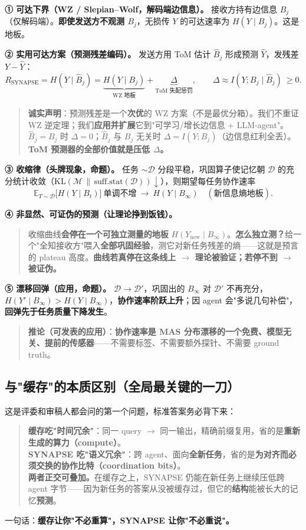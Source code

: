 \documentclass[UTF8,fontset=windows,11pt]{ctexart}
\newcommand{\key}[1]{\textbf{\textcolor{NavyBlue}{#1}}}
\begin{document}
\textbf{① 可达下界（WZ / Slepian--Wolf，解码端边信息）。} 接收方持有边信息 $B_j$（仅解码端）。\textbf{即使发送方不观测 $B_j$}，无损传 $Y$ 的可达速率为 $H(Y\mid B_j)$。这是地板。

\textbf{② 实用可达方案（预测残差编码）。} 发送方用 ToM 估计 $\hat B_j$ 形成预测 $\hat Y$，发残差 $Y-\hat Y$：
\[
R_{\text{SYNAPSE}}=H(Y\mid \hat B_j)=\underbrace{H(Y\mid B_j)}_{\text{WZ 地板}}+\underbrace{\Delta}_{\text{ToM 失配惩罚}},\qquad
\Delta\approx I(Y;B_j\mid \hat B_j)\ \ge 0.
\]
\begin{quote}\small
\textbf{诚实声明}：预测残差是一个\textbf{次优}的 WZ 方案（不是最优分箱）。我们不重证 WZ 逆定理；我们\textbf{应用并扩展}它到"可学习/增长边信息 + LLM-agent"。$\hat B_j=B_j$ 时 $\Delta=0$；$\hat B_j$ 与 $B_j$ 无关时 $\Delta=I(Y;B_j)$（边信息红利全丢）。\textbf{ToM 预测器的全部价值就是压低 $\Delta$。}
\end{quote}

\textbf{③ 收缩律（头牌现象，命题）。} 任务 $\sim\mathcal D$ 分段平稳，巩固算子使记忆朝 $\mathcal D$ 的充分统计收敛（$\mathrm{KL}(\mathcal M\,\|\,\mathrm{suff.stat}(\mathcal D))\downarrow$），则期望每任务协作速率
\[
\mathbb E_{T\sim\mathcal D}\big[H(Y\mid B_t)\big]\ \text{单调不增}\ \longrightarrow\ H(Y\mid B_\infty)\quad(\text{新信息熵地板}).
\]

\textbf{④ 非显然、可证伪的预测（让理论挣到饭钱）。}
\begin{quote}\small
收缩曲线\textbf{会停在一个可独立测量的地板} $H(Y_{\text{new}}\mid B_\infty)$。\textbf{怎么独立测？}给一个"全知接收方"喂入\textbf{全部巩固经验}，测它对新任务残差的熵——这就是预言的 plateau 高度。\textbf{曲线若真停在这条线上 $\to$ 理论被验证；若停不到 $\to$ 被证伪。}
\end{quote}

\textbf{⑤ 漂移回弹（应用，命题）。} $\mathcal D\to\mathcal D'$，巩固出的 $B_\infty$ 对 $\mathcal D'$ 不再充分，$H(Y'\mid B_\infty)>H(Y\mid B_\infty)$，\textbf{协作速率阶跃上升}；因 agent 会"多说几句补偿"，\textbf{回弹先于任务质量下降发生}。
\begin{quote}\small
\textbf{推论（可发表的应用）}：\textbf{协作速率是 MAS 分布漂移的一个免费、模型无关、提前的传感器}——不需要标签、不需要额外探针、不需要 ground truth。
\end{quote}

\subsection{与"缓存"的本质区别（全局最关键的一刀）}
这是评委和审稿人都会问的第一个问题，标准答案务必背下来：
\begin{quote}\small
\textbf{缓存吃"时间冗余"}：同一 query $\to$ 同一输出，精确前缀复用，省的是\textbf{重新生成的算力（compute）}。\\
\textbf{SYNAPSE 吃"语义冗余"}：跨 agent、面向\textbf{全新任务}，省的是\textbf{为对齐而必须交换的协作比特（coordination bits）}。\\
\textbf{两者正交可叠加。}在缓存之上，SYNAPSE 仍能在新任务上继续压低跨 agent 字节——因为新任务的答案从没被缓存过，但它的\textbf{结构}能被长大的记忆\textbf{预测}。
\end{quote}
一句话：\key{缓存让你"不必重算"，SYNAPSE 让你"不必重说"。}
\end{document}
